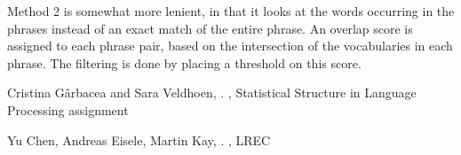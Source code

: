 \documentclass[11pt]{article}
\begin{document}
Method 2 is somewhat more lenient, in that it looks at the words occurring in the phrases instead of an exact match of the entire phrase. An overlap score is assigned to each phrase pair, based on the intersection of the vocabularies in each phrase. The filtering is done by placing a threshold on this score.




\begin{thebibliography}{}

{Cristina G{\^a}rbacea and Sara Veldhoen},
.
,
\newblock Statistical Structure in Language Processing assignment

{Yu Chen, Andreas Eisele, Martin Kay},
.
,
\newblock LREC
%
%
%
%
%

\end{thebibliography}
\end{document}
